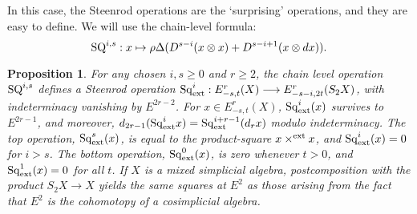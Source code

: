 \documentclass[11pt]{amsart}
\theoremstyle{plain}
\newtheorem{prop}[thm]{Proposition}
\theoremstyle{definition}
\renewcommand{\to}{\longrightarrow}
\theoremstyle{plain}
\newcommand{\Sq}{\mathrm{Sq}}
\begin{document}
In this case, the Steenrod operations are the `surprising' operations, and they are easy to define. We will use the chain-level formula:
\[\textup{SQ}^{i,s}:x\mapsto \rho\Delta (D^{s-i}(x\otimes x)+D^{s-i+1}(x\otimes dx)).\]
\begin{prop}
For any chosen $i,s\geq0$ and $r\geq2$, the chain level operation $\textup{SQ}^{i,s}$ defines a Steenrod operation $\Sq^i_\textup{ext}:E^r_{-s,t}(X)\to E^r_{-s-i,2t}(S_2X)$, with indeterminacy vanishing by $E^{2r-2}$. For $x\in E^r_{-s,t}(X)$, $\Sq^i_\textup{ext}(x)$ survives to $E^{2r-1}$, and moreover, $d_{2r-1}(\Sq^i_\textup{ext}x)=\Sq^{i+r-1}_\textup{ext}(d_rx)$ modulo indeterminacy. The top operation, $\Sq^s_\textup{ext}(x)$, is equal to the product-square $x\times^\textup{ext} x$, and $\Sq^i_\textup{ext}(x)=0$ for $i>s$. The bottom operation, $\Sq^0_\textup{ext}(x)$, is zero whenever $t>0$, and $\Sq^1_\textup{ext}(x)=0$ for all $t$. If $X$ is a mixed simplicial algebra, postcomposition with the product $S_2X\to X$ yields the same squares at $E^2$ as those arising from the fact that $E^2$ is the cohomotopy of a cosimplicial algebra.
\end{prop}
\end{document}
